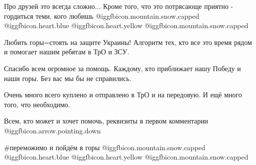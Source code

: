 Про друзей это всегда сложно... Кроме того, что это потрясающе приятно -
гордиться теми, кого любишь  @igg{fbicon.mountain.snow.capped}
@igg{fbicon.heart.blue}  @igg{fbicon.heart.yellow}
@igg{fbicon.mountain.snow.capped}  

Любить горы=стоять на защите Украины! Алгоритм тех, кто все это время рядом и
помогает нашим ребятам в ТрО и ЗСУ. 

Спасибо всем огромное за помощь. Каждому, кто приближает нашу Победу и наши
горы. Без вас мы бы не справились.

Очень много всего куплено и отправлено в ТрО и на передовую. И ещё много того,
что необходимо.

Всем, кто может и хочет помочь, реквизиты в первом комментарии @igg{fbicon.arrow.pointing.down}

\#переможимо  и пойдём в горы  @igg{fbicon.mountain.snow.capped}  @igg{fbicon.heart.blue}  @igg{fbicon.heart.yellow}  @igg{fbicon.mountain.snow.capped} 

